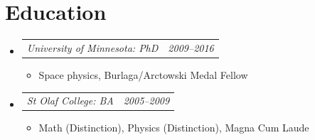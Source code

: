 \documentclass[12pt,letterpaper]{article}
\makeatletter
\newcommand{\headerpair}[2]{
    \begin{tabular*}{\linewidth}{l@{ \extracolsep{\fill} }r} {\large\emph{#1}} & {\large\emph{#2}}
    \end{tabular*}
}
\newcommand{\headerrow}[3]{\headerpair{#2: #1}{#3}}
\newcommand{\ResumeSection}[1]{\section*{{\color{MidnightBlue}#1 \sout{\hfill}}}}
\makeatother
\begin{document}

\ResumeSection{Education}

\begin{itemize}[leftmargin=\parindent]
    \parskip=0.1em
    \itemsep=1.2em

    \item[]
        \headerrow
            {PhD}
            {University of Minnesota}
            {2009--2016}
        \begin{itemize}[leftmargin=\parindent]
            \item Space physics, Burlaga/Arctowski Medal Fellow
        \end{itemize}
    \item[]
        \headerrow
            {BA}
            {St Olaf College}
            {2005--2009}
        \begin{itemize}[leftmargin=\parindent]
            \item Math (Distinction), Physics (Distinction),
                 Magna Cum Laude
        \end{itemize}
\end{itemize}
\end{document}
